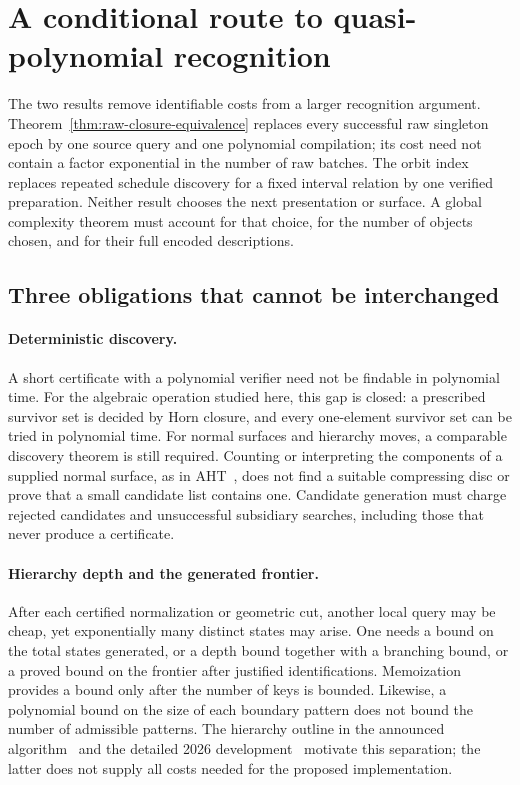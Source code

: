\section{A conditional route to quasi-polynomial recognition}
\label{sec:research-agenda}

The two results remove identifiable costs from a larger recognition
argument. Theorem~\ref{thm:raw-closure-equivalence} replaces every successful
raw singleton epoch by one source query and one polynomial compilation;
its cost need not contain a factor exponential in the number of raw
batches. The orbit index replaces repeated schedule discovery for a fixed
interval relation by one verified preparation. Neither result chooses the
next presentation or surface. A global complexity theorem must account
for that choice, for the number of objects chosen, and for their full
encoded descriptions.

\subsection{Three obligations that cannot be interchanged}

\paragraph{Deterministic discovery.}
A short certificate with a polynomial verifier need not be findable in
polynomial time. For the algebraic operation studied here, this gap is
closed: a prescribed survivor set is decided by Horn closure, and every
one-element survivor set can be tried in polynomial time. For normal
surfaces and hierarchy moves, a comparable discovery theorem is still
required. Counting or interpreting the components of a supplied normal
surface, as in AHT~\cite{aht}, does not find a suitable compressing disc or
prove that a small candidate list contains one. Candidate generation must
charge rejected candidates and unsuccessful subsidiary searches, including
those that never produce a certificate.

\paragraph{Hierarchy depth and the generated frontier.}
After each certified normalization or geometric cut, another local query
may be cheap, yet exponentially many distinct states may arise. One needs
a bound on the total states generated, or a depth bound together with a
branching bound, or a proved bound on the frontier after justified
identifications. Memoization provides a bound only after the number of
keys is bounded. Likewise, a polynomial bound on the size of each boundary
pattern does not bound the number of admissible patterns. The hierarchy
outline in the announced algorithm~\cite{lackenby-talk} and the detailed
2026 development~\cite{lackenby-2026} motivate this separation; the latter
does not supply all costs needed for the proposed implementation.

